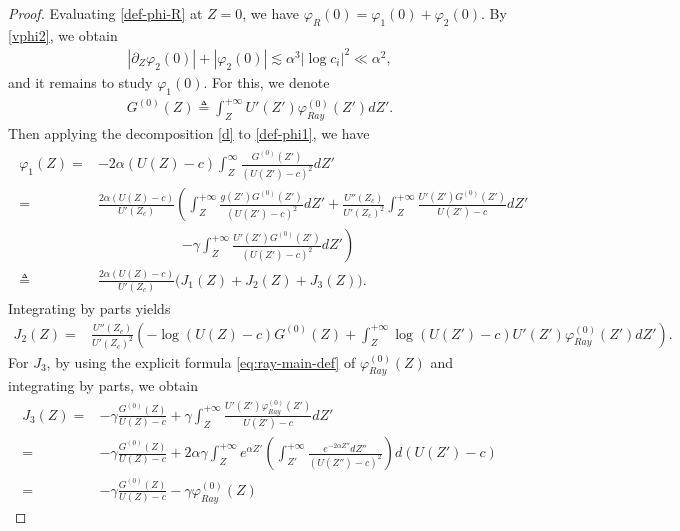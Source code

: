 \documentclass[reqno,11pt]{amsart}
\numberwithin{equation}{section}
\numberwithin{equation}{section}
\theoremstyle{plain}
\begin{document}
				\begin{proof}
						Evaluating \eqref{def-phi-R} at $Z=0$, we have $\varphi_R(0)=\varphi_1(0)+\varphi_2(0)$. By \eqref{vphi2}, we obtain 
					\begin{align}
						|\partial_Z\varphi_2(0)|+|\varphi_2(0)|\lesssim \alpha^3|\log c_i|^2\ll \alpha^2,\label{phi2}
					\end{align}
					and it remains to study $\varphi_1(0)$. For this, we denote
						\begin{align}
							G^{(0)}(Z)\triangleq \int_{Z}^{+\infty}U'(Z')\varphi_{Ray}^{(0)}(Z')dZ'.\nonumber
						\end{align} 
		Then applying the decomposition \eqref{d} to \eqref{def-phi1}, we have	
						\begin{align}\label{phi1}\begin{aligned}
								\varphi_1(Z)=&-2\alpha(U(Z)-c)\int_{Z}^\infty\frac{G^{(0)}(Z')}{(U(Z')-c)^2}d Z'
								\\
								= & \frac{2\alpha (U(Z)-c)}{U'(Z_c)}\left(\int_{Z}^{+\infty}\frac{g(Z')G^{(0)}(Z')}{(U(Z')-c)^2}dZ'
								+\frac{U''(Z_c)}{U'(Z_c)^2}\int_{Z}^{+\infty}\frac{U'(Z')G^{(0)}(Z')}{U(Z')-c}dZ'\right.\\
								&\qquad\qquad\qquad\left.%
								-\gamma\int_{Z}^{+\infty}\frac{U'(Z')G^{(0)}(Z')}{(U(Z')-c)^2}dZ'\right)\\
								\triangleq &\frac{2\alpha (U(Z)-c)}{U'(Z_c)}\Big(J_1(Z)+J_2(Z)+J_3(Z)\Big).
						\end{aligned}\end{align}
				Integrating by parts yields
						\begin{align}\label{j2}
							J_2(Z)= & \frac{U''(Z_c)}{U'(Z_c)^2}\left(-\log(U(Z)-c)
							G^{(0)}(Z)
							+\int_{Z}^{+\infty}\log(U(Z')-c)U'(Z')\varphi^{(0)}_{Ray}(Z') dZ'\right). \end{align}
				For $J_3$, by using the explicit formula \eqref{eq:ray-main-def} of $\varphi^{(0)}_{Ray}(Z)$ and integrating by parts,  we obtain
						\begin{align}
							J_3(Z)= & -\gamma\frac{G^{(0)}(Z)}{U(Z)-c}     +\gamma\int_{Z}^{+\infty}\frac{U'(Z')\varphi_{Ray}^{(0)}(Z')}{U(Z')-c}dZ'\nonumber\\
							= & -\gamma\frac{G^{(0)}(Z)}{U(Z)-c}     +2\alpha\gamma\int_{Z}^{+\infty}e^{\alpha Z'}\left(\int_{Z'}^{+\infty}\frac{e^{-2\alpha Z''}dZ''}{(U(Z'')-c)^2}\right)d(U(Z')-c)\nonumber\\
							= &-\gamma\frac{G^{(0)}(Z)}{U(Z)-c}-\gamma\varphi_{Ray}^{(0)}(Z)

\end{align}
\end{proof}
\end{document}
